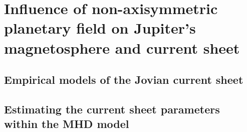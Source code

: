 \chapter{Influence of non-axisymmetric planetary field on Jupiter's magnetosphere and current sheet}

\section{Empirical models of the Jovian current sheet}
\section{Estimating the current sheet parameters within the MHD model}
